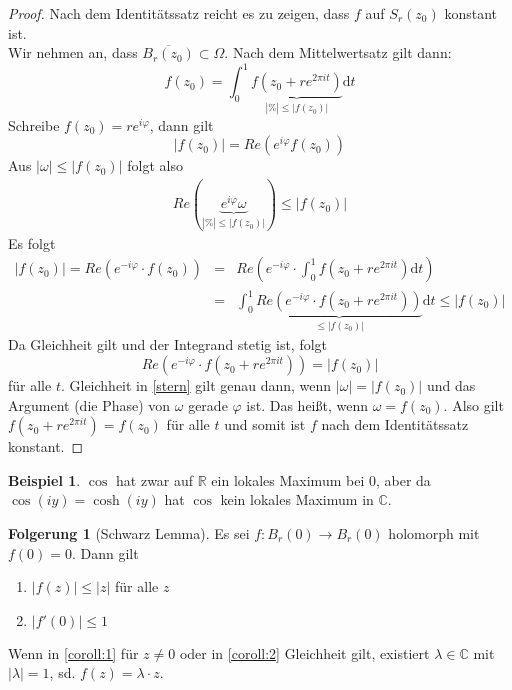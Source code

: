 \documentclass[11pt,titlepage]{article}
\theoremstyle{definition}
\newtheorem{corollary}[theorem]{Folgerung}
\newtheorem{example}[theorem]{Beispiel}
\theoremstyle{remark}
\begin{document}
	\begin{proof}
		Nach dem Identitätssatz reicht es zu zeigen, dass $f$ auf $S_r (z_0)$ konstant ist. \\
		Wir nehmen an, dass $\overline{B_r (z_0)}\subset\Omega$. Nach dem Mittelwertsatz gilt dann:
		\[ f(z_0)=\int_0^1 \underbrace{f(z_0 +re^{2\pi it})}_{|\%|\leq |f(z_0)|}\mathrm{d}t \]
		Schreibe $f(z_0)=re^{i\varphi}$, dann gilt 
		\[ |f(z_0)|= Re(e^{i\varphi}f(z_0)) \]
		Aus $|\omega|\leq|f(z_0)|$ folgt also 
		\begin{eqnarray}
			Re(\underbrace{e^{i\varphi}\omega}_{|\%|\leq |f(z_0)|})\leq |f(z_0)| \label{stern}
		\end{eqnarray}
		Es folgt 
		\begin{eqnarray*}
			|f(z_0)|=Re(e^{-i\varphi}\cdot f(z_0)) &=& 
			Re\left(e^{-i\varphi}\cdot \int_0^1 f(z_0 +re^{2\pi it})\mathrm{d}t\right) \\
			&=& \int_0^1 \underbrace{Re(e^{-i\varphi}\cdot f(z_0 +re^{2\pi it}))}_{\leq |f(z_0)|}
			\mathrm{d}t \leq |f(z_0)|
		\end{eqnarray*}
		Da Gleichheit gilt und der Integrand stetig ist, folgt
		\[ Re\left( e^{-i\varphi} \cdot f(z_0 +re^{2\pi it})\right) =|f(z_0)| \]
		für alle $t$. Gleichheit in \ref{stern} gilt genau dann, wenn $|\omega|=|f(z_0)|$ und das 
		Argument (die Phase) von $\omega$ gerade $\varphi$ ist. Das heißt, wenn $\omega =f(z_0)$. 
		Also gilt $f(z_0 +re^{2\pi it})=f(z_0)$ für alle $t$ und somit ist $f$ nach dem Identitätssatz 
		konstant.
	\end{proof}
	
	\begin{example}
		$\cos$ hat zwar auf $\mathbb{R}$ ein lokales Maximum bei $0$, aber da 
		$\cos (iy)=\cosh(iy)$ hat $\cos$ kein lokales Maximum in $\mathbb{C}$.
	\end{example}
	
	\begin{corollary}[Schwarz Lemma]
		Es sei $f:B_r (0)\to B_r(0)$ holomorph mit $f(0)=0$. Dann gilt
		\begin{enumerate}
			\item $|f(z)|\leq |z|$ für alle $z$ \label{coroll:1}
			\item $|f'(0)|\leq 1$ \label{coroll:2}
		\end{enumerate}
		Wenn in \ref{coroll:1} für $z\neq 0$ oder in \ref{coroll:2} Gleichheit gilt, existiert $\lambda\in
		\mathbb{C}$ mit $|\lambda|=1$, sd. $f(z)=\lambda\cdot z$.
	\end{corollary}
	
\end{document}
